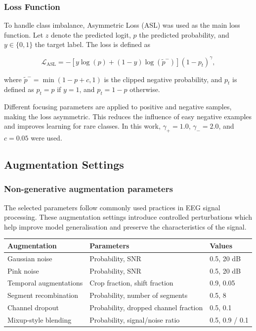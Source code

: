 \subsubsection{Loss Function}

To handle class imbalance, Asymmetric Loss (ASL) was used as the main loss function. Let $z$ denote the predicted logit, $p$ the predicted probability, and $y \in \{0,1\}$ the target label. The loss is defined as

\[
\mathcal{L}_{\text{ASL}} = - \left[ y \log(p) + (1 - y)\log(\tilde{p}^{-}) \right] (1 - p_t)^\gamma,
\]

where $\tilde{p}^{-} = \min(1 - p + c, 1)$ is the clipped negative probability, and $p_t$ is defined as $p_t = p$ if $y = 1$, and $p_t = 1 - p$ otherwise.

Different focusing parameters are applied to positive and negative samples, making the loss asymmetric. This reduces the influence of easy negative examples and improves learning for rare classes. In this work, $\gamma_{+} = 1.0$, $\gamma_{-} = 2.0$, and $c = 0.05$ were used.

\subsection{Augmentation Settings}

\subsubsection{Non-generative augmentation parameters}

The selected parameters follow commonly used practices in EEG signal processing. These augmentation settings introduce controlled perturbations which help improve model generalisation and preserve the characteristics of the signal.

\begin{table}[H]
\centering
\label{tab:augmentation_defaults}

\begin{tabularx}{\textwidth}{l X l}
\toprule
\textbf{Augmentation} & \textbf{Parameters} & \textbf{Values} \\
\midrule
Gaussian noise           & Probability, SNR                    & 0.5, 20 dB \\
Pink noise        & Probability, SNR                    & 0.5, 20 dB \\
Temporal augmentations & Crop fraction, shift fraction       & 0.9, 0.05 \\
Segment recombination & Probability, number of segments     & 0.5, 8 \\
Channel dropout       & Probability, dropped channel fraction & 0.5, 0.1 \\
Mixup-style blending  & Probability, signal/noise ratio     & 0.5, 0.9 / 0.1 \\
\bottomrule
\end{tabularx}
\end{table}

